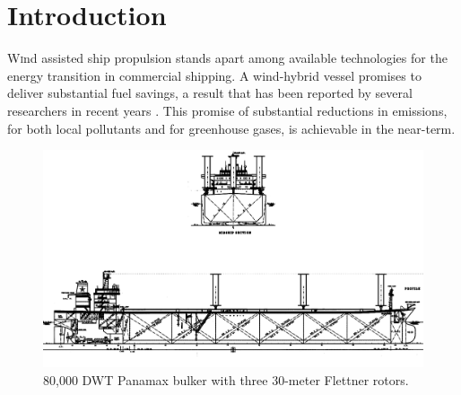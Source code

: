\documentclass[twoside,twocolumn]{article}
\begin{document}

\maketitle
\printnomenclature


\section{Introduction}

\lettrine[nindent=0em,lines=3]{W}ind assisted ship propulsion stands apart among available technologies for the energy transition in commercial shipping. A wind-hybrid vessel promises to deliver substantial fuel savings, a result that has been reported by several researchers in recent years \cite{Fujiwara05a, Naaijen10, Traut14, Eggers16}. This promise of substantial reductions in emissions, for both local pollutants and for greenhouse gases, is achievable in the near-term.

\begin{figure}[!ht]
	\centering
	\includegraphics[width=\textwidth]{images/Panamax530.png}  %
	\caption{80,000 DWT Panamax bulker with three 30-meter Flettner rotors.}
	\label{fig:Panamax}
\end{figure}
\end{document}
